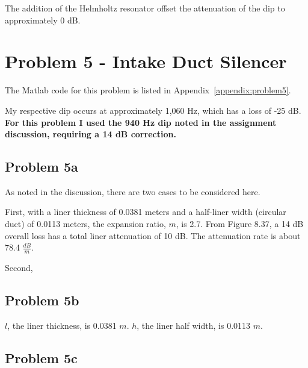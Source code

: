 {{{{The addition of the Helmholtz resonator offset the attenuation of the dip to approximately 0 dB.










\newpage
\section*{Problem 5 - Intake Duct Silencer}

The Matlab code for this problem is listed in Appendix~\ref{appendix:problem5}.

My respective dip occurs at approximately 1,060 Hz, which has a loss of -25 dB.  \textbf{For this problem I used the 940 Hz dip noted in the assignment discussion, requiring a 14 dB correction.}

\subsection*{Problem 5a}

As noted in the discussion, there are two cases to be considered here.

First, with a liner thickness of 0.0381 meters and a half-liner width (circular duct) of 0.0113 meters, the expansion ratio, $m$, is 2.7.  From Figure 8.37, a 14 dB overall loss has a total liner attenuation of 10 dB.  The attenuation rate is about 78.4 $\frac{dB}{m}$.

Second, 

%



\subsection*{Problem 5b}

$l$, the liner thickness, is 0.0381 $m$.  $h$, the liner half width, is 0.0113 $m$.


\subsection*{Problem 5c}

}}}}

